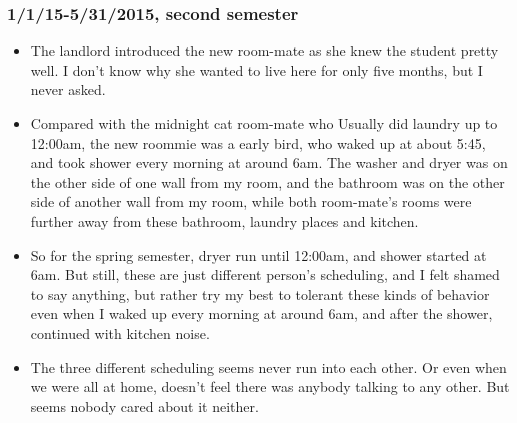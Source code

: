 \documentclass[9pt,b5paper]{article}
\begin{document}
\subsubsection{1/1/15-5/31/2015, second semester}
\label{sec-2-3-2}
\begin{itemize}
\item The landlord introduced the new room-mate as she knew the student pretty well. I don't know why she wanted to live here for only five months, but I never asked.
\item Compared with the midnight cat room-mate who Usually did laundry up to 12:00am, the new roommie was a early bird, who waked up at about 5:45, and took shower every morning at around 6am. The washer and dryer was on the other side of one wall from my room, and the bathroom was on the other side of another wall from my room, while both room-mate's rooms were further away from these bathroom, laundry places and kitchen.
\item So for the spring semester, dryer run until 12:00am, and shower started at 6am. But still, these are just different person's scheduling, and I felt shamed to say anything, but rather try my best to tolerant these kinds of behavior even when I waked up every morning at around 6am, and after the shower, continued with kitchen noise.
\item The three different scheduling seems never run into each other. Or even when we were all at home, doesn't feel there was anybody talking to any other. But seems nobody cared about it neither.
\end{itemize}
\end{document}
